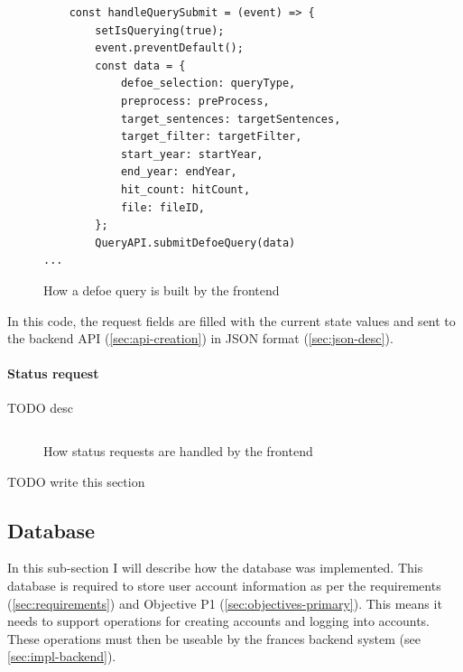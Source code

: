\documentclass[12pt, letterpaper]{article}
\begin{document}
\begin{flushleft}
\begin{figure}[H]
\begin{verbatim}
    const handleQuerySubmit = (event) => {
        setIsQuerying(true);
        event.preventDefault();
        const data = {
            defoe_selection: queryType,
            preprocess: preProcess,
            target_sentences: targetSentences,
            target_filter: targetFilter,
            start_year: startYear,
            end_year: endYear,
            hit_count: hitCount,
            file: fileID,
        };
        QueryAPI.submitDefoeQuery(data)
...
\end{verbatim}
\caption{How a defoe query is built by the frontend}
\end{figure}
\end{flushleft}

\begin{flushleft}
In this code, the request fields are filled with the current state values and sent to the backend API (\ref{sec:api-creation}) in JSON format (\ref{sec:json-desc}).
\end{flushleft}

\paragraph{Status request}

\begin{flushleft}
TODO desc
\end{flushleft}

\begin{flushleft}
\begin{figure}[H]
\begin{verbatim}

\end{verbatim}
\caption{How status requests are handled by the frontend}
\end{figure}
\end{flushleft}

TODO write this section

\subsection{Database}\label{sec:impl-database}

\begin{flushleft}
In this sub-section I will describe how the database was implemented. This database is required to store user account information as per the requirements (\ref{sec:requirements}) and Objective P1 (\ref{sec:objectives-primary}). This means it needs to support operations for creating accounts and logging into accounts. These operations must then be useable by the frances backend system (see \ref{sec:impl-backend}).
\end{flushleft}
\end{document}
